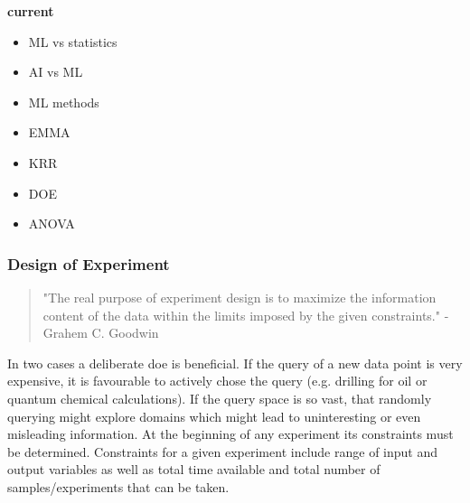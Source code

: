 \textbf{current}
\begin{itemize}
    \item ML vs statistics
    \item AI vs ML 
    \item ML methods
    \item EMMA 
    \item KRR 
    \item DOE
    \item ANOVA
\end{itemize}
\fi



\subsubsection{Design of Experiment} %
%
\begin{quote}
	{"The real purpose of experiment design is to maximize the information content of the data within the limits imposed by the given constraints."}
	- {Grahem C. Goodwin\cite{goodwin1977experiment}}
\end{quote}
%
In two cases a deliberate \gls{doe} is beneficial.
If the query of a new data point is very expensive, it is favourable to actively chose the query (e.g. drilling for oil or quantum chemical calculations). 
If the query space is so vast, that randomly querying might explore domains which might lead to uninteresting or even misleading information.
% 
At the beginning of any experiment its constraints must be determined. 
%
Constraints for a given experiment include range of input and output variables as well as total time available and total number of samples/experiments that can be taken.\cite{goodwin1977experiment}
%

